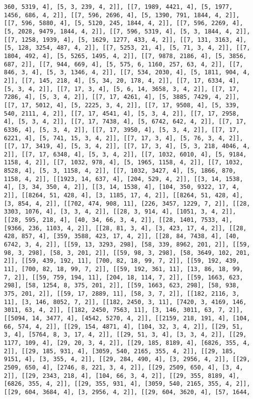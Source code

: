 \documentclass[12pt,fleqn]{article}\usepackage{../../common}
\begin{document}
\begin{verbatim}
360, 5319, 4], [5, 3, 239, 4, 2]], [[7, 1989, 4421, 4], [5, 1977, 1456, 686, 4, 2]], [[7, 596, 2696, 4], [5, 1390, 791, 1844, 4, 2]], [[7, 596, 5880, 4], [5, 5120, 245, 1844, 4, 2]], [[7, 596, 2269, 4], [5, 2028, 9479, 1844, 4, 2]], [[7, 596, 5319, 4], [5, 3, 1844, 4, 2]], [[7, 1258, 1939, 4], [5, 1629, 1277, 433, 4, 2]], [[7, 131, 3163, 4], [5, 128, 3254, 487, 4, 2]], [[7, 5253, 21, 4], [5, 71, 3, 4, 2]], [[7, 1804, 492, 4], [5, 5265, 1495, 4, 2]], [[7, 9878, 2186, 4], [5, 3856, 687, 2]], [[7, 944, 669, 4], [5, 575, 6, 1160, 257, 63, 4, 2]], [[7, 846, 3, 4], [5, 3, 1346, 4, 2]], [[7, 534, 2030, 4], [5, 1811, 904, 4, 2]], [[7, 145, 218, 4], [5, 34, 20, 178, 4, 2]], [[7, 17, 6334, 4], [5, 3, 4, 2]], [[7, 17, 3, 4], [5, 6, 14, 3658, 3, 4, 2]], [[7, 17, 7286, 4], [5, 3, 4, 2]], [[7, 17, 4261, 4], [5, 3885, 7429, 4, 2]], [[7, 17, 5012, 4], [5, 2225, 3, 4, 2]], [[7, 17, 9508, 4], [5, 339, 540, 2111, 4, 2]], [[7, 17, 4541, 4], [5, 3, 4, 2]], [[7, 17, 2958, 4], [5, 3, 4, 2]], [[7, 17, 7438, 4], [5, 6742, 642, 4, 2]], [[7, 17, 6336, 4], [5, 3, 4, 2]], [[7, 17, 3950, 4], [5, 3, 4, 2]], [[7, 17, 6221, 4], [5, 741, 15, 3, 4, 2]], [[7, 17, 3, 4], [5, 76, 3, 4, 2]], [[7, 17, 3419, 4], [5, 3, 4, 2]], [[7, 17, 3, 4], [5, 3, 218, 4046, 4, 2]], [[7, 17, 6348, 4], [5, 3, 4, 2]], [[7, 1032, 6010, 4], [5, 9184, 1158, 4, 2]], [[7, 1032, 978, 4], [5, 1965, 1158, 4, 2]], [[7, 1032, 8528, 4], [5, 3, 1158, 4, 2]], [[7, 1032, 3427, 4], [5, 1866, 870, 1158, 4, 2]], [[1923, 14, 637, 4], [204, 529, 4, 2]], [[3, 14, 1538, 4], [3, 34, 350, 4, 2]], [[3, 14, 1538, 4], [104, 350, 9322, 17, 4, 2]], [[8264, 51, 428, 4], [3, 1185, 17, 4, 2]], [[8264, 51, 428, 4], [3, 854, 4, 2]], [[702, 474, 908, 11], [226, 3457, 1229, 7, 2]], [[28, 3303, 1076, 4], [3, 3, 4, 2]], [[28, 3, 914, 4], [1051, 3, 4, 2]], [[28, 595, 218, 4], [40, 34, 66, 3, 4, 2]], [[28, 1401, 7533, 4], [9366, 236, 1103, 4, 2]], [[28, 81, 3, 4], [3, 423, 17, 4, 2]], [[28, 428, 857, 4], [359, 3588, 423, 17, 4, 2]], [[28, 84, 7438, 4], [40, 6742, 3, 4, 2]], [[59, 13, 3293, 298], [58, 339, 8962, 201, 2]], [[59, 98, 3, 298], [58, 3, 201, 2]], [[59, 98, 3, 298], [58, 3649, 102, 201, 2]], [[59, 439, 192, 11], [700, 82, 18, 99, 7, 2]], [[59, 192, 439, 11], [700, 82, 18, 99, 7, 2]], [[59, 192, 361, 11], [13, 86, 18, 99, 7, 2]], [[59, 759, 194, 11], [204, 18, 114, 7, 2]], [[59, 1663, 623, 298], [58, 1254, 8, 375, 201, 2]], [[59, 1663, 623, 298], [58, 938, 375, 201, 2]], [[59, 17, 2889, 11], [58, 3, 7, 2]], [[182, 2116, 3, 11], [3, 146, 8052, 7, 2]], [[182, 2450, 3, 11], [7420, 3, 4169, 146, 3011, 63, 4, 2]], [[182, 2450, 7563, 11], [3, 146, 3011, 63, 7, 2]], [[5094, 14, 3477, 4], [4542, 5270, 4, 2]], [[2159, 218, 191, 4], [104, 66, 574, 4, 2]], [[29, 154, 4871, 4], [104, 32, 3, 4, 2]], [[29, 51, 3, 4], [5764, 8, 3, 17, 4, 2]], [[29, 51, 3, 4], [3, 3, 4, 2]], [[29, 1177, 109, 4], [29, 20, 3, 4, 2]], [[29, 185, 8189, 4], [6826, 355, 4, 2]], [[29, 185, 931, 4], [3059, 540, 2165, 355, 4, 2]], [[29, 185, 9151, 4], [3, 355, 4, 2]], [[29, 284, 490, 4], [3, 2956, 4, 2]], [[29, 2509, 650, 4], [2746, 8, 221, 3, 4, 2]], [[29, 2509, 650, 4], [3, 4, 2]], [[29, 2343, 218, 4], [104, 66, 3, 4, 2]], [[29, 355, 8189, 4], [6826, 355, 4, 2]], [[29, 355, 931, 4], [3059, 540, 2165, 355, 4, 2]], [[29, 604, 3684, 4], [3, 2956, 4, 2]], [[29, 604, 3620, 4], [57, 1644, 
\end{verbatim}
\end{document}
